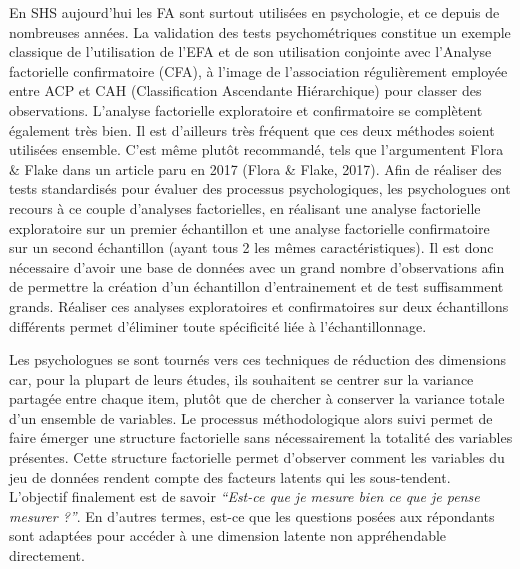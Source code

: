 \documentclass[
  french,
  11pt,
  a4paper,
]{article}
\begin{document}
En SHS aujourd'hui les FA sont surtout utilisées en psychologie, et ce
depuis de nombreuses années. La validation des tests psychométriques
constitue un exemple classique de l'utilisation de l'EFA et de son
utilisation conjointe avec l'Analyse factorielle confirmatoire (CFA), à
l'image de l'association régulièrement employée entre ACP et CAH
(Classification Ascendante Hiérarchique) pour classer des observations.
L'analyse factorielle exploratoire et confirmatoire se complètent
également très bien. Il est d'ailleurs très fréquent que ces deux
méthodes soient utilisées ensemble. C'est même plutôt recommandé, tels
que l'argumentent Flora \& Flake dans un article paru en 2017 (Flora \&
Flake, 2017). Afin de réaliser des tests standardisés pour évaluer des
processus psychologiques, les psychologues ont recours à ce couple
d'analyses factorielles, en réalisant une analyse factorielle
exploratoire sur un premier échantillon et une analyse factorielle
confirmatoire sur un second échantillon (ayant tous 2 les mêmes
caractéristiques). Il est donc nécessaire d'avoir une base de données
avec un grand nombre d'observations afin de permettre la création d'un
échantillon d'entrainement et de test suffisamment grands. Réaliser ces
analyses exploratoires et confirmatoires sur deux échantillons
différents permet d'éliminer toute spécificité liée à l'échantillonnage.

Les psychologues se sont tournés vers ces techniques de réduction des
dimensions car, pour la plupart de leurs études, ils souhaitent se
centrer sur la variance partagée entre chaque item, plutôt que de
chercher à conserver la variance totale d'un ensemble de variables. Le
processus méthodologique alors suivi permet de faire émerger une
structure factorielle sans nécessairement la totalité des variables
présentes. Cette structure factorielle permet d'observer comment les
variables du jeu de données rendent compte des facteurs latents qui les
sous-tendent. L'objectif finalement est de savoir \emph{``Est-ce que je
mesure bien ce que je pense mesurer ?''}. En d'autres termes, est-ce que
les questions posées aux répondants sont adaptées pour accéder à une
dimension latente non appréhendable directement.
\end{document}
